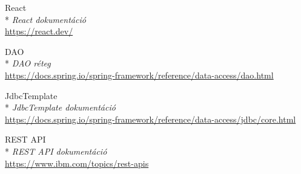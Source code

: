 \begin{thebibliography}{x}
 React\\*
\textit{React dokumentáció}
\\ \url{https://react.dev/}

 DAO\\*
\textit{DAO réteg}
\\ \url{https://docs.spring.io/spring-framework/reference/data-access/dao.html}

 JdbcTemplate\\*
\textit{JdbcTemplate dokumentáció}
\\ \url{https://docs.spring.io/spring-framework/reference/data-access/jdbc/core.html}

 REST API\\*
\textit{REST API dokumentáció}
\\ \url{https://www.ibm.com/topics/rest-apis}



\end{thebibliography}